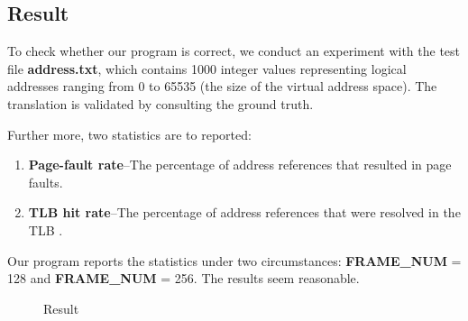 \documentclass{article}
\begin{document}
\subsection*{Result}
To check whether our program is correct, we conduct an experiment with the test file \textbf{address.txt}, which contains 1000 integer values representing logical addresses ranging from 0 to 65535 (the size of the virtual address space). The translation is validated by consulting the ground truth. 

Further more, two statistics are to reported: 

\begin{enumerate}
    \item \textbf{Page-fault rate}--The percentage of address references that resulted in page faults.
    \item \textbf{TLB hit rate}--The percentage of address references that were resolved in
    the TLB .
\end{enumerate}

Our program reports the statistics under two circumstances: \textbf{FRAME\_NUM} = 128 and \textbf{FRAME\_NUM} = 256. The results seem reasonable.

\begin{figure}[h]
    \centering
    
    \caption{Result}
    \label{}
\end{figure}
\end{document}
